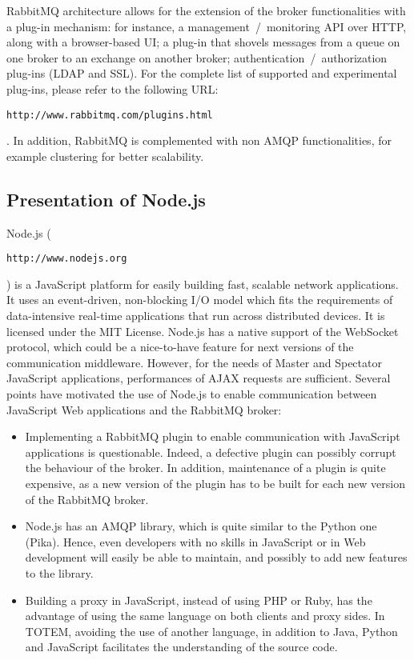 \textsf{RabbitMQ} architecture allows for the extension of the broker
functionalities with a plug-in mechanism: for instance, a
management~/~monitoring API over HTTP, along with a browser-based UI;
a plug-in that shovels messages from a queue on one broker to an
exchange on another broker; authentication~/~authorization plug-ins
(LDAP and SSL). For the complete list of supported and experimental
plug-ins, please refer to the following
URL: \begin{small}\texttt{http://\-www.\-rabbitmq.\-com/\-plugins.html}\end{small}. In
addition, \textsf{RabbitMQ} is complemented with non AMQP
functionalities, for example clustering for better scalability.

\subsection{Presentation of \textsf{Node.js}}
\label{SS_presentation_nodejs}

\textsf{Node.js} (\begin{small}\texttt{http://www.nodejs.org}\end{small})
is a JavaScript platform for easily building fast, scalable network 
applications. It uses an event-driven, non-blocking I/O model which fits the
requirements of data-intensive real-time applications that run across 
distributed devices. It is licensed under the MIT License. 
\textsf{Node.js} has a native support of the WebSocket protocol, which could be 
a nice-to-have feature for next versions of the communication middleware.
However, for the needs of Master and Spectator JavaScript applications, 
performances of AJAX requests are sufficient.
Several points have motivated the use of \textsf{Node.js} to enable 
communication between JavaScript Web applications and the RabbitMQ broker:

\begin{itemize}
\item Implementing a RabbitMQ plugin to enable communication with JavaScript 
  applications is questionable. Indeed, a defective plugin can possibly corrupt 
  the behaviour of the broker. In addition, maintenance of a plugin is quite 
  expensive, as a new version of the plugin has to be built for each new 
  version of the RabbitMQ broker.
\item Node.js has an AMQP library, which is quite similar to the Python one
    (Pika). Hence, even developers with no skills in JavaScript or in Web 
    development will easily be able to maintain, and possibly to
    add new features to the library.
\item Building a proxy in JavaScript, instead of using PHP or Ruby, has the
    advantage of using the same language on both clients and proxy sides.
    In TOTEM, avoiding the use of another language, in addition to Java, Python 
    and JavaScript facilitates the understanding of the source code.
\end{itemize}

\endinput
